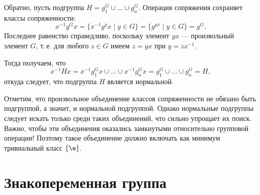 \begin{enumerate}
Обратно, пусть подгруппа $H=g_1^G\cup\dots\cup g_n^G$. Операция сопряжения сохраняет классы сопряженности:
$$
x^{-1}g^Gx=\{x^{-1}g^yx\mid y\in G\} = \{g^{yx}\mid y\in G\}=g^G.
$$
Последнее равенство справедливо, поскольку элемент $yx$ --- произвольный элемент $G$, т.\,е. для любого $z\in G$ имеем $z=yx$ при $y=zx^{-1}$.

Тогда получаем, что
$$
x^{-1}Hx=x^{-1}g_1^Gx\cup\dots\cup x^{-1}g_n^Gx =g_1^G\cup\dots\cup g_n^G=H,
$$
откуда следует, что подгруппа $H$ является нормальной.
\epf

Отметим, что произвольное объединение классов сопряженности не обязано быть подгруппой, а значит, и нормальной подгруппой. Однако нормальные подгруппы следует искать только среди таких объединений, что сильно упрощает их поиск. Важно, чтобы эти объединения оказались замкнутыми относительно групповой операции! Поэтому такое объединение должно включать как минимум тривиальный класс $\{\e\}$.
\end{enumerate}




\section{Знакопеременная группа}


